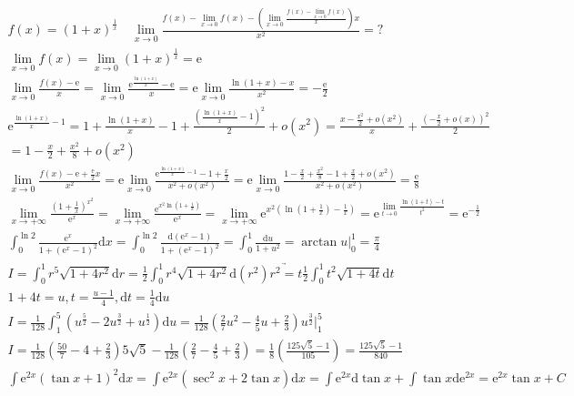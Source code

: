 \documentclass{article}
\begin{document}
\begin{align*}
    f(x) = (1+x)^{\frac{1}{x}} \quad \lim_{x \to 0} \frac{f(x)-\lim_{x \to 0}f(x) - \left( \lim_{x \to 0}\frac{f(x)-\lim_{x \to 0}f(x)}{x}\right) x}{x^2} = ? \\ 
    \lim_{x \to 0} f(x) = \lim_{x \to 0} (1+x)^{\frac{1}{x}} = \mathrm{e} \\ 
    \lim_{x \to 0} \frac{f(x) - \mathrm{e}}{x} = \lim_{x \to 0} \frac{\mathrm{e}^{\frac{\ln(1+x)}{x}}-\mathrm{e}}{x} = \mathrm{e} \lim_{x \to 0} \frac{\ln(1+x)-x}{x^2} = - \frac{\mathrm{e}}{2} \\
    \mathrm{e}^{\frac{\ln(1+x)}{x}-1} = 1 + \frac{\ln(1+x)}{x} - 1 + \frac{\left(\frac{\ln(1+x)}{x} - 1\right)^2}{2} + o(x^2) = \frac{x-\frac{x^2}{2}+o(x^2)}{x} + \frac{\left(-\frac{x}{2}+o(x)\right)^2}{2} \\
    = 1-\frac{x}{2}+\frac{x^2}{8} +o(x^2) \\
    \lim_{x \to 0} \frac{f(x) - \mathrm{e} + \frac{\mathrm{e}}{2}x}{x^2} = \mathrm{e} \lim_{x \to 0} \frac{\mathrm{e}^{\frac{\ln(1+x)}{x}-1} -1 +\frac{x}{2} }{x^2+o(x^2)} =     \mathrm{e}\lim_{x \to 0} \frac{1- \frac{x}{2} + \frac{x^2}{8} -1+\frac{x}{2} + o(x^2) }{x^2+o(x^2)} = \frac{\mathrm{e}}{8} \\
    \lim_{x \to +\infty} \frac{(1+\frac{1}{x})^{x^2}}{\mathrm{e}^{x}} = \lim_{x \to +\infty} \frac{\mathrm{e}^{x^2 \ln \left(1+\frac{1}{x}\right)}}{\mathrm{e}^{x}} = \lim_{x \to +\infty} \mathrm{e}^{x^2\left(\ln(1+\frac{1}{x})-\frac{1}{x}\right)} = \mathrm{e}^{\lim_{ t \to 0}\frac{\ln(1+t)-t}{t^2}} = \mathrm{e}^{-\frac{1}{2}}\\
    \int_{0}^{\ln 2} \frac{\mathrm{e}^{x}}{1+(\mathrm{e}^x -1)^2} \mathrm{d}x = \int_{0}^{\ln 2} \frac{\mathrm{d}(\mathrm{e}^x-1)}{1+(\mathrm{e}^x-1)^2} = \int_{0}^{1} \frac{\mathrm{d}u}{1+u^2} = \arctan u |_{0}^{1} = \frac{\pi}{4} \\
    I = \int_{0}^{1} r^5\sqrt{1+4r^2} \mathrm{d}r = \frac{1}{2} \int_{0}^{1} r^4\sqrt{1+4r^2}\mathrm{d}(r^2) \underrightarrow{r^2=t} \frac{1}{2} \int_{0}^{1} t^2\sqrt{1+4t}\mathrm{d}t \\
    1+4t = u , t = \frac{u - 1}{4},\mathrm{d}t = \frac{1}{4}\mathrm{d}u\\
    I = \frac{1}{128} \int_{1}^{5} (u^{\frac{5}{2}}-2u^{\frac{3}{2}}+u^{\frac{1}{2}}) \mathrm{d}u = \frac{1}{128} \left(\frac{2}{7}u^{2} - \frac{4}{5}u +\frac{2}{3}\right)u^{\frac{3}{2}} |_{1}^{5}\\
    I = \frac{1}{128} \left(\frac{50}{7} - 4 +\frac{2}{3}\right)5\sqrt{5} - \frac{1}{128}\left(\frac{2}{7} - \frac{4}{5} + \frac{2}{3} \right) = \frac{1}{8}\left(\frac{125\sqrt{5}-1}{105}\right) = \frac{125\sqrt{5}-1}{840} \\
    \int \mathrm{e}^{2x}(\tan x + 1)^2 \mathrm{d}x = \int \mathrm{e}^{2x}(\sec^2 x + 2\tan x) \mathrm{d}x = \int \mathrm{e}^{2x} \mathrm{d}\tan x + \int \tan x \mathrm{d}\mathrm{e}^{2x} = \mathrm{e}^{2x} \tan x + C \\ 
\end{align*}
\end{document}
